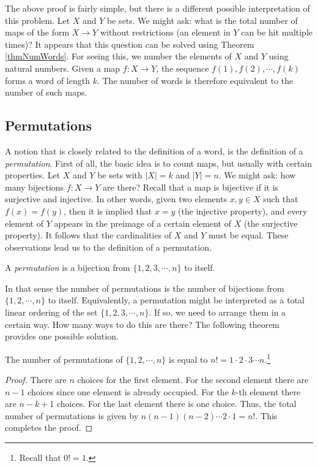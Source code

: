 The above proof is fairly simple, but there is a different possible interpretation of this problem. Let $X$ and $Y$ be sets. We might ask: what is the total
number of maps of the form $X \to Y$ without restrictions (an element in $Y$ can be hit multiple times)? It appears that this question can be solved using 
Theorem \ref{thmNumWords}. For seeing this, we number the elements of $X$ and $Y$ using natural numbers.
Given a map $f:X \to Y$, the sequence $f(1),f(2), \cdots, f(k)$ forms a word of length $k$. The number of words is therefore equivalent to the number of such maps.

\subsection{Permutations}

A notion that is closely related to the definition of a word, is the definition of a \textit{permutation}. First of all, the basic idea is to count maps, but 
usually with certain properties. Let $X$ and $Y$ be sets with $|X|=k$ and $|Y|=n$. We might ask: how many bijections $f:X \to Y$ are there? Recall that
a map is bijective if it is surjective and injective. In other words, given two elements $x,y \in X$ such that $f(x)=f(y)$, then it is implied that $x=y$ (the injective property), and 
every element of $Y$ appears in the preimage of a certain element of $X$ (the surjective property). It follows that the cardinalities of $X$ and $Y$ must be equal.
These observations lead us to the definition of a permutation.

\begin{defn}[permutation]
A \textit{permutation} is a bijection from $\{1, 2, 3, \cdots, n\}$ to itself.
\end{defn}
\noindent
In that sense the number of permutations is the number of bijections from $\{1, 2, \cdots, n\}$ to itself.
Equivalently, a permutation might be interpreted as a total linear ordering of the set $\{1, 2, 3, \cdots, n\}$.
If so, we need to arrange them in a certain way. How many ways to do this are there? 
The following theorem provides one possible solution.

\begin{theorem}
The number of permutations of $\{1, 2, \cdots, n\}$ is equal to $n!=1\cdot 2 \cdot 3 \cdots n$.\footnote{Recall that $0!=1$.}
\end{theorem}

\begin{proof}
There are $n$ choices for the first element. For the second element there are $n-1$ choices since
one element is already occupied. For the $k$-th element there are $n-k+1$ choices. For the last element there is one choice.
Thus, the total number of permutations is given by $n(n-1)(n-2)\cdots 2 \cdot 1=n!$. This completes the proof.
\end{proof}

